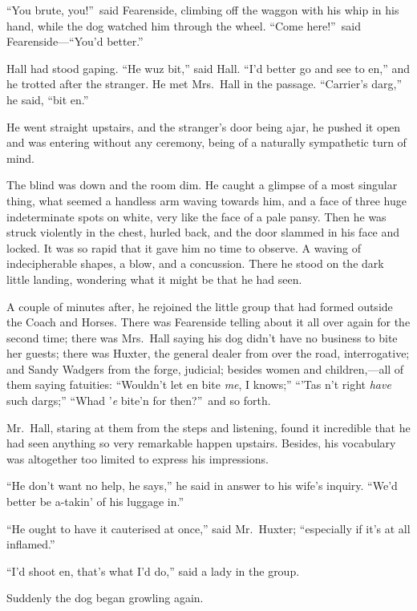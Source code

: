 {
“You brute, you!”\ said Fearenside, climbing off the waggon with his whip in his hand, while the dog watched him through the wheel. “Come here!”\ said Fearenside—“You’d better.”}

Hall had stood gaping. “He wuz bit,” said Hall. “I’d better go and see to en,” and he trotted after the stranger. He met Mrs.\ Hall in the passage. “Carrier’s darg,” he said, “bit en.”

He went straight upstairs, and the stranger’s door being ajar, he pushed it open and was entering without any ceremony, being of a naturally sympathetic turn of mind.

The blind was down and the room dim. He caught a glimpse of a most singular thing, what seemed a handless arm waving towards him, and a face of three huge indeterminate spots on white, very like the face of a pale pansy. Then he was struck violently in the chest, hurled back, and the door slammed in his face and locked. It was so rapid that it gave him no time to observe. A waving of indecipherable shapes, a blow, and a concussion. There he stood on the dark little landing, wondering what it might be that he had seen.

A couple of minutes after, he rejoined the little group that had formed outside the Coach and Horses. There was Fearenside telling about it all over again for the second time; there was Mrs.\ Hall saying his dog didn’t have no business to bite her guests; there was Huxter, the general dealer from over the road, interrogative; and Sandy Wadgers from the forge, judicial; besides women and children,—all of them saying fatuities: “Wouldn’t let en bite \emph{me}, I knows;” “\kern0.5pt’Tas n’t right \emph{have} such dargs;” “Whad ’\emph{e} bite’n for then?”\ and so forth.

Mr.\ Hall, staring at them from the steps and listening, found it incredible that he had seen anything so very remarkable happen upstairs. Besides, his vocabulary was altogether too limited to express his impressions.

“He don’t want no help, he says,” he said in answer to his wife’s inquiry. “We’d better be a-takin’ of his luggage in.”

“He ought to have it cauterised at once,” said Mr.\ Huxter; “especially if it’s at all inflamed.”

“I’d shoot en, that’s what I’d do,” said a lady in the group.

Suddenly the dog began growling again.

